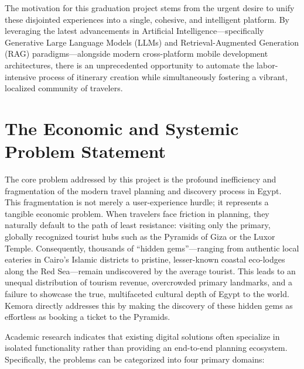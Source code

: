 The motivation for this graduation project stems from the urgent desire to unify these disjointed experiences into a single, cohesive, and intelligent platform. By leveraging the latest advancements in Artificial Intelligence---specifically Generative Large Language Models (LLMs) and Retrieval-Augmented Generation (RAG) paradigms---alongside modern cross-platform mobile development architectures, there is an unprecedented opportunity to automate the labor-intensive process of itinerary creation while simultaneously fostering a vibrant, localized community of travelers.

\section{The Economic and Systemic Problem Statement}
The core problem addressed by this project is the profound inefficiency and fragmentation of the modern travel planning and discovery process in Egypt. This fragmentation is not merely a user-experience hurdle; it represents a tangible economic problem. When travelers face friction in planning, they naturally default to the path of least resistance: visiting only the primary, globally recognized tourist hubs such as the Pyramids of Giza or the Luxor Temple. Consequently, thousands of ``hidden gems''---ranging from authentic local eateries in Cairo's Islamic districts to pristine, lesser-known coastal eco-lodges along the Red Sea---remain undiscovered by the average tourist. This leads to an unequal distribution of tourism revenue, overcrowded primary landmarks, and a failure to showcase the true, multifaceted cultural depth of Egypt to the world. Kemora directly addresses this by making the discovery of these hidden gems as effortless as booking a ticket to the Pyramids.

Academic research indicates that existing digital solutions often specialize in isolated functionality rather than providing an end-to-end planning ecosystem. Specifically, the problems can be categorized into four primary domains:


